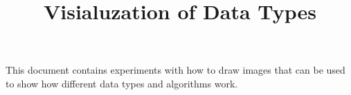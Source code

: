 \documentclass{scrartcl}
\begin{document}
  \title{Visialuzation of Data Types}

  This document contains experiments with how to draw images that
  can be used to show how different data types and algorithms work.

  
  
\end{document}

